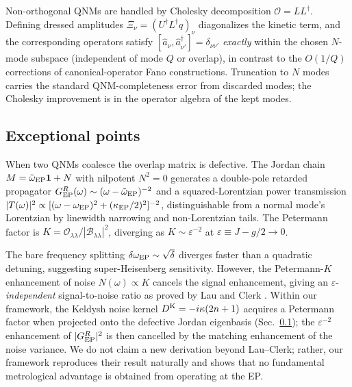 \documentclass[11pt]{article}
\newcommand{\K}{{\rm K}}
\newcommand{\EP}{{\rm EP}}
\newcommand{\tomega}{\tilde{\omega}}
\newcommand{\calO}{\mathcal{O}}
\begin{document}
Non-orthogonal QNMs are handled by Cholesky decomposition
$\calO=LL^\dagger$.  Defining dressed amplitudes
$\Xi_\nu=(U^\dagger L^\dagger q)_\nu$ diagonalizes the kinetic term,
and the corresponding operators satisfy
$[\hat a_\nu,\hat a_{\nu'}^\dagger]=\delta_{\nu\nu'}$ \emph{exactly}
within the chosen $N$-mode subspace (independent of mode $Q$ or
overlap), in contrast to the $O(1/Q)$ corrections of canonical-operator
Fano constructions.  Truncation to $N$ modes carries the standard
QNM-completeness error from discarded modes; the Cholesky improvement
is in the operator algebra of the kept modes.

\subsection{Exceptional points}
\label{sec:ep}

When two QNMs coalesce the overlap matrix is defective.  The Jordan
chain $M=\tomega_\EP\mathbf{1}+N$ with nilpotent $N^2=0$ generates a
double-pole retarded propagator
$G^R_\EP(\omega)\sim(\omega-\tomega_\EP)^{-2}$ and a squared-Lorentzian
power transmission
$|T(\omega)|^2\propto[(\omega-\omega_\EP)^2+(\kappa_\EP/2)^2]^{-2}$,
distinguishable from a normal mode's Lorentzian by linewidth narrowing
and non-Lorentzian tails.  The Petermann factor is
$K=\calO_{\lambda\lambda}/|\mathcal{B}_{\lambda\lambda}|^2$, diverging as
$K\sim\varepsilon^{-2}$ at $\varepsilon\equiv J-g/2\to 0$.

\begin{remark}
The bare frequency splitting $\delta\omega_\EP\sim\sqrt\delta$
diverges faster than a quadratic detuning, suggesting super-Heisenberg
sensitivity.  However, the Petermann-$K$ enhancement of noise
$N(\omega)\propto K$ cancels the signal enhancement, giving an
$\varepsilon$-\emph{independent} signal-to-noise ratio as proved by
Lau and Clerk \cite{Lau2018}.  Within our framework, the Keldysh
noise kernel $D^\K = -i\kappa(2n+1)$ acquires a Petermann factor when
projected onto the defective Jordan eigenbasis (Sec.~\ref{sec:ep}); the
$\varepsilon^{-2}$ enhancement of $|G^R_\EP|^2$ is then cancelled by
the matching enhancement of the noise variance.  We do not claim a
new derivation beyond Lau--Clerk; rather, our framework reproduces
their result naturally and shows that no fundamental metrological
advantage is obtained from operating at the EP.
\end{remark}

\end{document}
